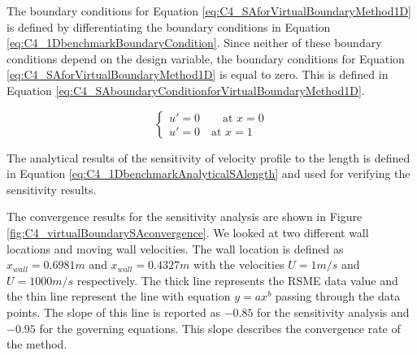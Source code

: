 The boundary conditions for Equation \eqref{eq:C4_SAforVirtualBoundaryMethod1D} is defined by differentiating the boundary conditions in Equation \eqref{eq:C4_1DbenchmarkBoundaryCondition}. Since neither of these boundary conditions depend on the design variable, the boundary conditions for Equation \eqref{eq:C4_SAforVirtualBoundaryMethod1D} is equal to zero. This is defined in Equation \eqref{eq:C4_SAboundaryConditionforVirtualBoundaryMethod1D}.

\begin{equation}\label{eq:C4_SAboundaryConditionforVirtualBoundaryMethod1D}
\begin{cases}
	u' = 0 \qquad \text{at } x = 0 \\
	u' = 0 \quad \text{at } x = 1
\end{cases}
\end{equation}

The analytical results of the sensitivity of velocity profile to the length is defined in Equation \eqref{eq:C4_1DbenchmarkAnalyticalSAlength} and used for verifying the sensitivity results.

The convergence results for the sensitivity analysis are shown in Figure \ref{fig:C4_virtualBoundarySAconvergence}. We looked at two different wall locations and moving wall velocities. The wall location is defined as $x_{wall} = 0.6981 m$ and $x_{wall} = 0.4327 m$ with the velocities $U = 1 m/s$ and $U = 1000 m/s$ respectively. The thick line represents the RSME data value and the thin line represent the line with equation $y = ax^b$ passing through the data points. The slope of this line is reported as $-0.85$ for the sensitivity analysis and $-0.95$ for the governing equations. This slope describes the convergence rate of the method.

